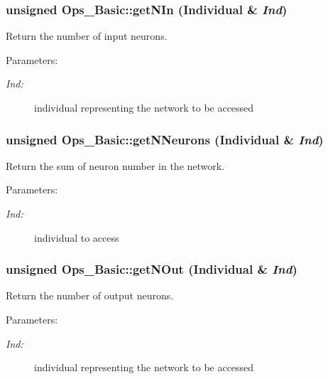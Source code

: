 \subsubsection{\setlength{\rightskip}{0pt plus 5cm}unsigned Ops\_\-Basic::get\-NIn (Individual \& {\em Ind})}\label{classOps__Basic_a6}


Return the number of input neurons.

\begin{Desc}
\item[Parameters: ]\par
\begin{description}
\item[{\em 
Ind:}]individual representing the network to be accessed \end{description}
\end{Desc}
\subsubsection{\setlength{\rightskip}{0pt plus 5cm}unsigned Ops\_\-Basic::get\-NNeurons (Individual \& {\em Ind})\hspace{0.3cm}{\tt  [protected]}}\label{classOps__Basic_b0}


Return the sum of neuron number in the network.

\begin{Desc}
\item[Parameters: ]\par
\begin{description}
\item[{\em 
Ind:}]individual to access \end{description}
\end{Desc}
\subsubsection{\setlength{\rightskip}{0pt plus 5cm}unsigned Ops\_\-Basic::get\-NOut (Individual \& {\em Ind})}\label{classOps__Basic_a8}


Return the number of output neurons.

\begin{Desc}
\item[Parameters: ]\par
\begin{description}
\item[{\em 
Ind:}]individual representing the network to be accessed \end{description}
\end{Desc}
